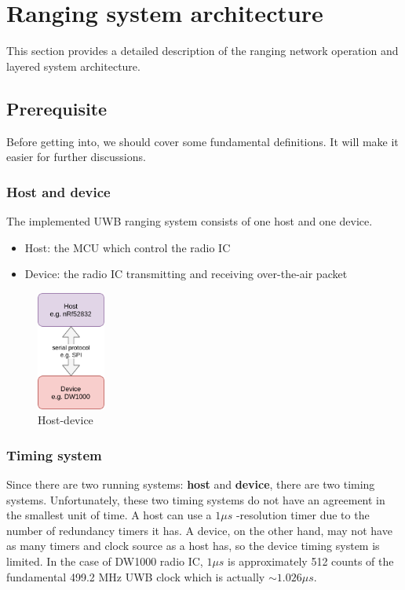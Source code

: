 \documentclass[\main/main.tex]{subfiles}
\begin{document}
\graphicspath{{img/}{03_firmware/img/}}

\chapter{Ranging system architecture}
This section provides a detailed description of the ranging network operation and layered system architecture.

\section{Prerequisite}
Before getting into, we should cover some fundamental definitions. It will make it easier for further discussions. 

\subsection{Host and device}
The implemented UWB ranging system consists of one host and one device.
\begin{itemize}
    \item Host: the MCU which control the radio IC 
    \item Device: the radio IC transmitting and receiving over-the-air packet
\end{itemize}

\begin{figure}[H]
    \begin{center}
        \includegraphics[width=0.2\textwidth]{host_device.png}
    \end{center}
    \caption{Host-device}
    \label{fig:host_device}
\end{figure}

\subsection{Timing system}
\label{subsec:timing_system_subsection}
Since there are two running systems: \textbf{host} and \textbf{device}, there are two timing systems. Unfortunately, these two timing systems do not have an agreement in the smallest unit of time. A host can use a $1\mu s$ -resolution timer due to the number of redundancy timers it has. A device, on the other hand, may not have as many timers and clock source as a host has, so the device timing system is limited. In the case of DW1000 radio IC, $1\mu s$ is approximately 512 counts of the fundamental 499.2 MHz UWB clock which is actually \textbf{$\sim 1.026\mu s$}. 
\end{document}
